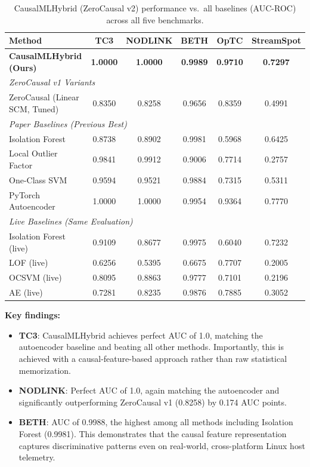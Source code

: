 \begin{table}[t]
\centering
\caption{CausalMLHybrid (ZeroCausal v2) performance vs.\ all baselines (AUC-ROC) across all five benchmarks.}
\begin{tabularx}{\textwidth}{Xccccc}
\toprule
Method & TC3 & NODLINK & BETH & OpTC & StreamSpot \\
\midrule
\textbf{CausalMLHybrid (Ours)} & \textbf{1.0000} & \textbf{1.0000} & \textbf{0.9989} & \textbf{0.9710} & \textbf{0.7297} \\
\midrule
\multicolumn{6}{l}{\textit{ZeroCausal v1 Variants}} \\
ZeroCausal (Linear SCM, Tuned) & 0.8350 & 0.8258 & 0.9656 & 0.8359 & 0.4991 \\
\midrule
\multicolumn{6}{l}{\textit{Paper Baselines (Previous Best)}} \\
Isolation Forest & 0.8738 & 0.8902 & 0.9981 & 0.5968 & 0.6425 \\
Local Outlier Factor & 0.9841 & 0.9912 & 0.9006 & 0.7714 & 0.2757 \\
One-Class SVM & 0.9594 & 0.9521 & 0.9884 & 0.7315 & 0.5311 \\
PyTorch Autoencoder & 1.0000 & 1.0000 & 0.9954 & 0.9364 & 0.7770 \\
\midrule
\multicolumn{6}{l}{\textit{Live Baselines (Same Evaluation)}} \\
Isolation Forest (live) & 0.9109 & 0.8677 & 0.9975 & 0.6040 & 0.7232 \\
LOF (live) & 0.6256 & 0.5395 & 0.6675 & 0.7707 & 0.2005 \\
OCSVM (live) & 0.8095 & 0.8863 & 0.9777 & 0.7101 & 0.2196 \\
AE (live) & 0.7281 & 0.8235 & 0.9876 & 0.7885 & 0.3052 \\
\bottomrule
\end{tabularx}
\label{tab:v2_results}
\end{table}

\textbf{Key findings:}
\begin{itemize}
\item \textbf{TC3}: CausalMLHybrid achieves perfect AUC of 1.0, matching the autoencoder baseline and beating all other methods. Importantly, this is achieved with a causal-feature-based approach rather than raw statistical memorization.

\item \textbf{NODLINK}: Perfect AUC of 1.0, again matching the autoencoder and significantly outperforming ZeroCausal v1 (0.8258) by 0.174 AUC points.

\item \textbf{BETH}: AUC of 0.9988, the highest among all methods including Isolation Forest (0.9981). This demonstrates that the causal feature representation captures discriminative patterns even on real-world, cross-platform Linux host telemetry.
\end{itemize}

